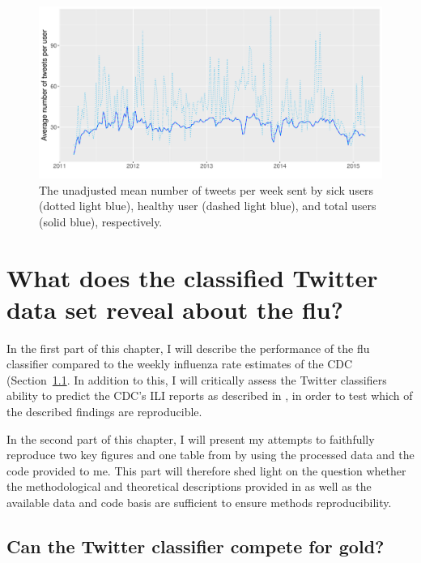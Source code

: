 \documentclass[11pt, a4paper,twoside]{report}\usepackage[]{graphicx}\usepackage[]{color}
\begin{document}
\begin{figure}[H]
\centering
\includegraphics[width=1\linewidth]{10_avg_tw_sick_healthy.pdf}
\caption{The unadjusted mean number of tweets per week sent by sick users (dotted light blue), healthy user (dashed light blue), and total users (solid blue), respectively.}
\label{fig:avg_tw_diff}
\end{figure}

\thispagestyle{empty}
\cleardoublepage

\chapter{What does the classified Twitter data set reveal about the flu?}
\label{ch:results}

In the first part of this chapter, I will describe the performance of the flu classifier compared to the weekly influenza rate estimates of the CDC (Section~\ref{sec:comparison_cdc}. In addition to this, I will critically assess the Twitter classifiers ability to predict the CDC's ILI reports as described in \cite{bodnar_data_2015}, in order to test which of the described findings are reproducible.

In the second part of this chapter, I will present my attempts to faithfully reproduce two key figures and one table from \cite{bodnar_data_2015} by using the processed data and the code provided to me. This part will therefore shed light on the question whether the methodological and theoretical descriptions provided in \cite{bodnar_data_2015} as well as the available data and code basis are sufficient to ensure methods reproducibility.

\section{Can the Twitter classifier compete for gold?}
\label{sec:comparison_cdc}
\end{document}
